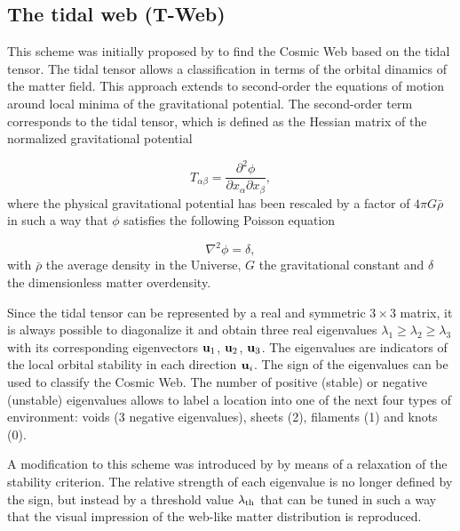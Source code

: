 \documentclass[a4,useAMS,usenatbib,usegraphicx]{mn2e}
\newcommand{\eq}[2]{\begin{equation} \label{eq:#1} #2 \end{equation}}
\begin{document}
\subsection{The tidal web (T-Web)}
\label{subsec:Tweb}

This scheme was initially proposed by \citet{Hahn07}  to find the
Cosmic Web based on the tidal tensor. 
The tidal tensor allows a classification in terms of the orbital
dinamics of the matter field.
This approach extends to second-order the equations of motion around 
local minima of the gravitational potential. 
The second-order term corresponds to the tidal tensor, which is
defined as the Hessian matrix of the normalized gravitational
potential


\eq{V_web}
{	T_{\alpha\beta} = \frac{\partial^2\phi}{\partial x_{\alpha}\partial x_{\beta}},	}
where the physical gravitational potential has been rescaled by a
factor of   $4\pi G\bar{\rho}$ in such a way that $\phi$ satisfies the following 
Poisson equation

\eq{Poisson}
{	\nabla^2\phi = \delta,	}
with $\bar{\rho}$ the average density in the Universe, $G$ the 
gravitational constant and $\delta$ the dimensionless matter
overdensity. 


Since the tidal tensor can be represented by a real and  symmetric
$3\times 3$ matrix, it is always possible to diagonalize  
it and obtain three real eigenvalues $\lambda_{1}\geq\lambda_{2}\geq
\lambda_3$ with its corresponding eigenvectors ${\bf u}_{1}$, ${\bf u}_{2}$,
${\bf u}_{3}$. 
The eigenvalues are indicators of the local  orbital stability
in each direction ${\bf u}_i$. 
The sign of the eigenvalues can be used to classify the Cosmic Web.
The number of positive (stable) or negative (unstable) eigenvalues allows 
to label a location into one of the next four types of environment: 
voids (3 negative eigenvalues), sheets (2), filaments (1) and knots (0). 


A modification to this scheme was introduced by \citet{Forero09}
by means of a relaxation of the stability criterion. 
The relative strength  of each eigenvalue is no longer defined by the
sign, but instead by a threshold value $\lambda_{\rm th}$ that can be
tuned in such a way that the visual impression of the web-like matter
distribution is reproduced. 
 
\end{document}
